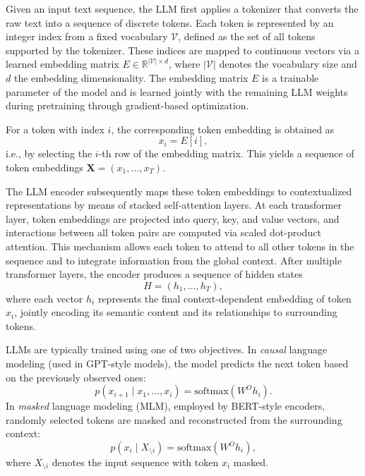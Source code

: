 \documentclass[FCD_GNN.tex]{subfiles}
\begin{document}
Given an input text sequence, the LLM first applies a tokenizer that converts the
raw text into a sequence of discrete tokens.
Each token is represented by an integer index from a fixed vocabulary
$\mathcal{V}$, defined as the set of all tokens supported by the tokenizer.
These indices are mapped to continuous vectors via a learned embedding matrix
$E \in \mathbb{R}^{|\mathcal{V}| \times d}$, where $|\mathcal{V}|$ denotes the
vocabulary size and $d$ the embedding dimensionality.
The embedding matrix $E$ is a trainable parameter of the model and is learned
jointly with the remaining LLM weights during pretraining through gradient-based
optimization.

For a token with index $i$, the corresponding token embedding is obtained as
\begin{equation}
    x_i = E[i],
\end{equation}
i.e., by selecting the $i$-th row of the embedding matrix.
This yields a sequence of token embeddings
$\mathbf{X} = (x_1, \dots, x_T)$.

The LLM encoder subsequently maps these token embeddings to contextualized
representations by means of stacked self-attention layers.
At each transformer layer, token embeddings are projected into query, key, and
value vectors, and interactions between all token pairs are computed via scaled
dot-product attention.
This mechanism allows each token to attend to all other tokens in the sequence
and to integrate information from the global context.
After multiple transformer layers, the encoder produces a sequence of hidden
states
\begin{equation}
    H = (h_1, \dots, h_T),
\end{equation}
where each vector $h_i$ represents the final context-dependent embedding of token
$x_i$, jointly encoding its semantic content and its relationships to surrounding
tokens.


LLMs are typically trained using one of two objectives.
In \textit{causal} language modeling (used in GPT-style models), the model 
predicts the next token based on the previously observed ones:
\begin{equation}
    p(x_{i+1} \mid x_1,\dots,x_i) = \mathrm{softmax}(W^O h_i).
\end{equation}
In \textit{masked} language modeling (MLM), employed by BERT-style encoders, 
randomly selected tokens are masked and reconstructed from the surrounding 
context:
\begin{equation}
    p(x_i \mid X_{\setminus i}) = \mathrm{softmax}(W^O h_i),
\end{equation}
where $X_{\setminus i}$ denotes the input sequence with token $x_i$ masked.
\end{document}
